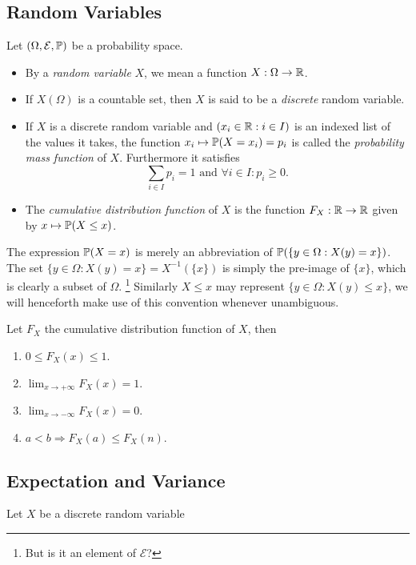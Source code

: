 \subsection{Random Variables}
\begin{definition}
    Let $(\Omega, \mathcal{E}, \mathbb{P})$ be a probability space. 
    \begin{itemize}
        \item By a \emph{random variable} $X$, we mean a function $X : \Omega \to \mathbb{R}$.
        \item If $X(\Omega)$ is a countable set, then $X$ is said to be a \emph{discrete} random variable.
        \item If $X$ is a discrete random variable and $(x_i \in \mathbb{R} : i \in I)$ is an indexed list of the values it takes, the function $x_i \mapsto \mathbb{P}(X = x_i) = p_i$ is called the \emph{probability mass function} of $X$. Furthermore it satisfies
        \begin{equation*}
            \sum_{i \in I} p_i = 1 \text{ and } \forall i \in I : p_i \geq 0.
        \end{equation*}
        \item The \emph{cumulative distribution function} of $X$ is the function $F_X : \mathbb{R} \to \mathbb{R}$ given by $x \mapsto \mathbb{P}(X \leq x)$.
    \end{itemize}
\end{definition}
The expression $\mathbb{P}(X = x)$ is merely an abbreviation of $\mathbb{P}(\{ y \in \Omega : X(y) = x \})$. The set $\{ y \in \Omega : X(y) = x \} = X^{-1}(\{x\})$ is simply the pre-image of $\{x\}$, which is clearly a subset of $\Omega$. \footnote{But is it an element of $\mathcal{E}$?}  
Similarly $X \leq x$ may represent $\{y \in \Omega : X(y) \leq x \}$, we will henceforth make use of this convention whenever unambiguous. 

\begin{theorem}
Let $F_X$ the cumulative distribution function of $X$, then
\begin{enumerate}
    \item $ 0 \leq F_X(x) \leq 1$.
    \item $\lim_{x \to + \infty} F_X(x) = 1$.
    \item $\lim_{x \to - \infty} F_X(x) = 0$.
    \item $a < b \Rightarrow F_X(a) \leq F_X(n)$.
\end{enumerate}    
\end{theorem}

\subsection{Expectation and Variance}
\begin{definition}
    Let $X$ be a discrete random variable 
\end{definition}